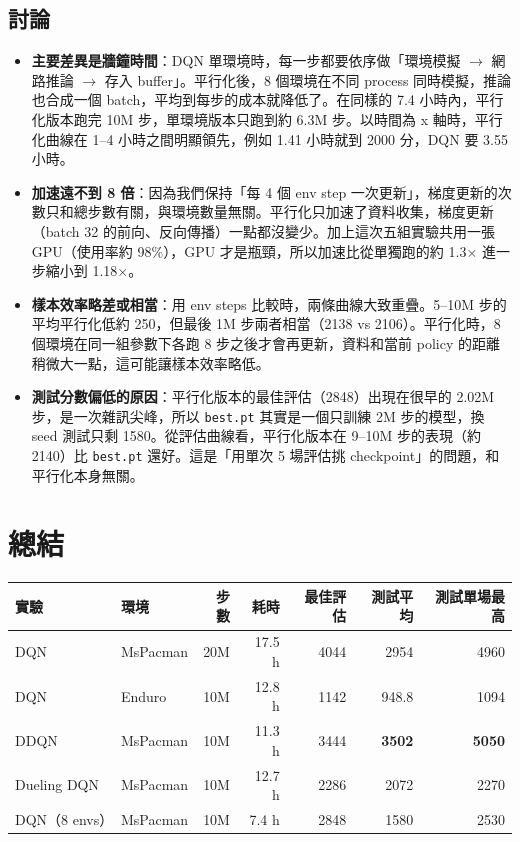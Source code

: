 \documentclass[11pt,a4paper]{article}
\begin{document}
\subsection{討論}
\begin{itemize}
  \item \textbf{主要差異是牆鐘時間}：DQN 單環境時，每一步都要依序做「環境模擬 $\rightarrow$ 網路推論 $\rightarrow$ 存入 buffer」。平行化後，8 個環境在不同 process 同時模擬，推論也合成一個 batch，平均到每步的成本就降低了。在同樣的 7.4 小時內，平行化版本跑完 10M 步，單環境版本只跑到約 6.3M 步。以時間為 x 軸時，平行化曲線在 1--4 小時之間明顯領先，例如 1.41 小時就到 2000 分，DQN 要 3.55 小時。
  \item \textbf{加速遠不到 8 倍}：因為我們保持「每 4 個 env step 一次更新」，梯度更新的次數只和總步數有關，與環境數量無關。平行化只加速了資料收集，梯度更新（batch 32 的前向、反向傳播）一點都沒變少。加上這次五組實驗共用一張 GPU（使用率約 98\%），GPU 才是瓶頸，所以加速比從單獨跑的約 1.3$\times$ 進一步縮小到 1.18$\times$。
  \item \textbf{樣本效率略差或相當}：用 env steps 比較時，兩條曲線大致重疊。5--10M 步的平均平行化低約 250，但最後 1M 步兩者相當（2138 vs 2106）。平行化時，8 個環境在同一組參數下各跑 8 步之後才會再更新，資料和當前 policy 的距離稍微大一點，這可能讓樣本效率略低。
  \item \textbf{測試分數偏低的原因}：平行化版本的最佳評估（2848）出現在很早的 2.02M 步，是一次雜訊尖峰，所以 \texttt{best.pt} 其實是一個只訓練 2M 步的模型，換 seed 測試只剩 1580。從評估曲線看，平行化版本在 9--10M 步的表現（約 2140）比 \texttt{best.pt} 還好。這是「用單次 5 場評估挑 checkpoint」的問題，和平行化本身無關。
\end{itemize}

\section{總結}

\begin{table}[H]\centering\small
\begin{tabular}{llrrrrr}
\toprule
實驗 & 環境 & 步數 & 耗時 & 最佳評估 & 測試平均 & 測試單場最高 \\
\midrule
DQN & MsPacman & 20M & 17.5 h & 4044 & 2954 & 4960 \\
DQN & Enduro & 10M & 12.8 h & 1142 & 948.8 & 1094 \\
DDQN & MsPacman & 10M & 11.3 h & 3444 & \textbf{3502} & \textbf{5050} \\
Dueling DQN & MsPacman & 10M & 12.7 h & 2286 & 2072 & 2270 \\
DQN（8 envs） & MsPacman & 10M & 7.4 h & 2848 & 1580 & 2530 \\
\bottomrule
\end{tabular}
\end{table}
\end{document}
